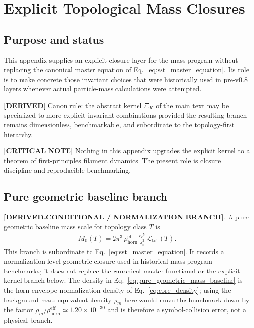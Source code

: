 \documentclass[11pt]{article}
\theoremstyle{definition}
\theoremstyle{plain}
\theoremstyle{remark}
\newcommand{\rhoM}{\rho_{\!m}}
\newcommand{\rhohorn}{\rho_{\mathrm{horn}}^{\mathrm{eff}}}
\newcommand{\rc}{{r_c}}
\begin{document}
        \newpage
    
    
    \section{Explicit Topological Mass Closures}
    \label{sec:appendix_explicit_mass}
    
    \subsection{Purpose and status}
        This appendix supplies an explicit closure layer for the mass program without replacing the canonical master equation of Eq.~\eqref{eq:sst_master_equation}. Its role is to make concrete those invariant choices that were historically used in pre-v0.8 layers whenever actual particle-mass calculations were attempted.
        
        \textbf{[DERIVED]} Canon rule: the abstract kernel \(\Xi_K\) of the main text may be specialized to more explicit invariant combinations provided the resulting branch remains dimensionless, benchmarkable, and subordinate to the topology-first hierarchy.
        
        \textbf{[CRITICAL NOTE]} Nothing in this appendix upgrades the explicit kernel to a theorem of first-principles filament dynamics. The present role is closure discipline and reproducible benchmarking.

    \subsection{Pure geometric baseline branch}
        \textbf{[DERIVED-CONDITIONAL / NORMALIZATION BRANCH].}
        A pure geometric baseline mass scale for topology class $T$ is
        \begin{align}
            M_0(T)
            =
            2\pi^3\,\rhohorn\,\frac{\rc^5}{\lambda_c^2}\,\mathcal{L}_{\mathrm{tot}}(T).
            \label{eq:pure_geometric_mass_baseline}
        \end{align}
        This branch is subordinate to Eq.~\eqref{eq:sst_master_equation}. It records a normalization-level geometric closure used in historical mass-program benchmarks; it does not replace the canonical master functional or the explicit kernel branch below. The density in Eq.~\eqref{eq:pure_geometric_mass_baseline} is the horn-envelope normalization density of Eq.~\eqref{eq:core_density}; using the background mass-equivalent density $\rhoM$ here would move the benchmark down by the factor $\rhoM/\rhohorn\simeq1.20\times10^{-30}$ and is therefore a symbol-collision error, not a physical branch.
\end{document}
